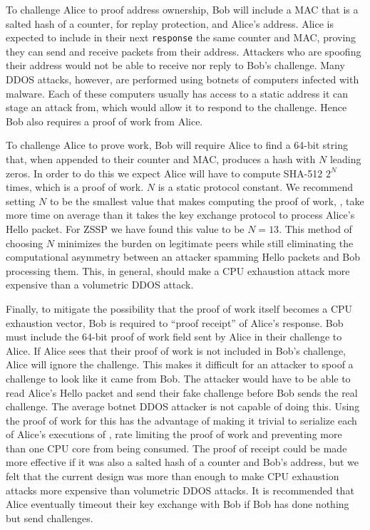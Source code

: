 \documentclass{article}
\begin{document}
To challenge Alice to proof address ownership, Bob will include a MAC that is a salted hash of a counter, for replay protection, and Alice's address. Alice is expected to include in their next \texttt{response} the same counter and MAC, proving they can send and receive packets from their address. Attackers who are spoofing their address would not be able to receive nor reply to Bob's challenge. Many DDOS attacks, however, are performed using botnets of computers infected with malware. Each of these computers usually has access to a static address it can stage an attack from, which would allow it to respond to the challenge. Hence Bob also requires a proof of work from Alice.

To challenge Alice to prove work, Bob will require Alice to find a 64-bit string that, when appended to their counter and MAC, produces a hash with $N$ leading zeros. In order to do this we expect Alice will have to compute SHA-512 $2^N$ times, which is a proof of work. $N$ is a static protocol constant. We recommend setting $N$ to be the smallest value that makes computing the proof of work, , take more time on average than it takes the key exchange protocol to process Alice's Hello packet. For ZSSP we have found this value to be $N=13$. This method of choosing $N$ minimizes the burden on legitimate peers while still eliminating the computational asymmetry between an attacker spamming Hello packets and Bob processing them. This, in general, should make a CPU exhaustion attack more expensive than a volumetric DDOS attack.

Finally, to mitigate the possibility that the proof of work itself becomes a CPU exhaustion vector, Bob is required to ``proof receipt'' of Alice's response. Bob must include the 64-bit proof of work field sent by Alice in their challenge to Alice. If Alice sees that their proof of work is not included in Bob's challenge, Alice will ignore the challenge. This makes it difficult for an attacker to spoof a challenge to look like it came from Bob. The attacker would have to be able to read Alice's Hello packet and send their fake challenge before Bob sends the real challenge. The average botnet DDOS attacker is not capable of doing this. Using the proof of work for this has the advantage of making it trivial to serialize each of Alice's executions of , rate limiting the proof of work and preventing more than one CPU core from being consumed. The proof of receipt could be made more effective if it was also a salted hash of a counter and Bob's address, but we felt that the current design was more than enough to make CPU exhaustion attacks more expensive than volumetric DDOS attacks. It is recommended that Alice eventually timeout their key exchange with Bob if Bob has done nothing but send challenges.
\end{document}
